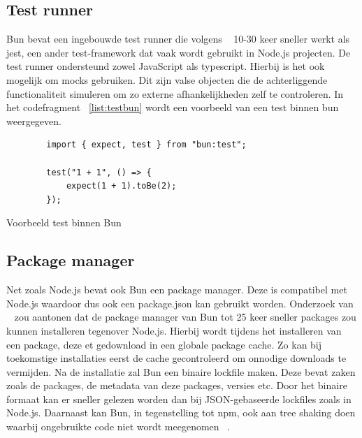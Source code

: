 \subsection{Test runner}
Bun bevat een ingebouwde test runner die volgens ~\textcite{McDonnel2023} 10-30 keer sneller werkt als jest, een ander test-framework dat vaak wordt gebruikt in Node.js projecten.
De test runner ondersteund zowel JavaScript als typescript. Hierbij is het ook mogelijk om mocks gebruiken.
Dit zijn valse objecten die de achterliggende functionaliteit simuleren om zo externe afhankelijkheden zelf te controleren.
In het codefragment ~\ref{list:testbun} wordt een voorbeeld van een test binnen bun weergegeven.
\begin{listing}[H]
    \centering
    \begin{verbatim}
        import { expect, test } from "bun:test";

        test("1 + 1", () => {
            expect(1 + 1).toBe(2);
        });
        \end{verbatim}
        \caption{\label{list:testbun}Voorbeeld test binnen Bun ~\autocite{McDonnel2023}}
\end{listing}

\subsection{Package manager}
Net zoals Node.js bevat ook Bun een package manager. 
Deze is compatibel met Node.js waardoor dus ook een package.json kan gebruikt worden.
Onderzoek van ~\textcite{McDonnel2023} zou aantonen dat de package manager 
van Bun tot 25 keer sneller packages zou kunnen installeren tegenover Node.js.
Hierbij wordt tijdens het installeren van een package, 
deze et gedownload in een globale package cache. Zo kan bij toekomstige installaties 
eerst de cache gecontroleerd om onnodige downloads te vermijden. Na de installatie zal Bun een binaire lockfile maken. 
Deze bevat zaken zoals de packages, de metadata van deze packages, versies etc. Door het binaire formaat kan er sneller gelezen worden dan bij JSON-gebaseerde lockfiles zoals in Node.js.
Daarnaast kan Bun, in tegenstelling tot npm, ook aan tree shaking doen waarbij ongebruikte code niet wordt meegenomen ~\autocite{Aghdasi2023}.


